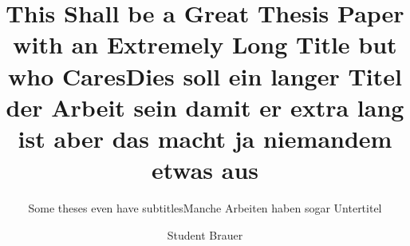 \documentclass[%
    thesis=ma, %
    language=american, %
    paper=a4,%
    listings,
]{isw}
\title{This Shall be a Great Thesis Paper with an Extremely Long Title but who Cares}
\subtitle{Some theses even have subtitles}
\author{Student Brauer}
\begin{document}
    \frontmatter
    
    \maketitle
    
    \begin{otherlanguage}{ngerman}
        \title{Dies soll ein langer Titel der Arbeit sein damit er extra lang ist aber das macht ja niemandem etwas aus}
        \subtitle{Manche Arbeiten haben sogar Untertitel}
        \maketitle
    \end{otherlanguage}
    
    \begin{dedication}
        \lipsum[1]
    \end{dedication}
    
    
    \begin{thesis-abstract}
        \lipsum[1-3]
        
    \end{thesis-abstract}
    
    \tableofcontents
    \listoffigures
    \listoftables
    
    
    \listoftodos
    
    \mainmatter
    
    
    
    \begin{appendices}
        
    \end{appendices}
    
    
    
\end{document}

